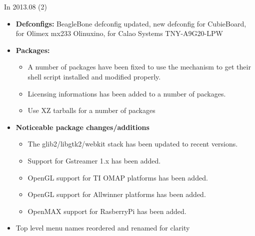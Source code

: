 \begin{frame}{In 2013.08 (2)}
  \begin{itemize}
  \item {\bf Defconfigs:} BeagleBone defconfig updated, new defconfig
    for CubieBoard, for Olimex mx233 Olinuxino, for Calao Systems
    TNY-A9G20-LPW
  \item {\bf Packages:}
    \begin{itemize}
    \item A number of packages have been fixed to use the
       mechanism to get their
       shell script installed and modified
      properly.
    \item Licensing informations has been added to a number of
      packages.
    \item Use XZ tarballs for a number of packages
    \end{itemize}
  \item {\bf Noticeable package changes/additions}
    \begin{itemize}
    \item The glib2/libgtk2/webkit stack has been updated to recent versions.
    \item Support for Gstreamer 1.x has been added.
    \item OpenGL support for TI OMAP platforms has been added.
    \item OpenGL support for Allwinner platforms has been added.
    \item OpenMAX support for RasberryPi has been added.
    \end{itemize}
  \item Top level menu names reordered and renamed for clarity
  \end{itemize}
\end{frame}

